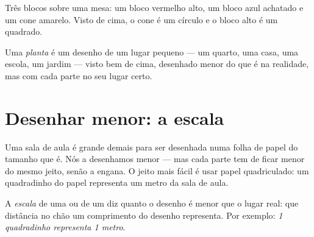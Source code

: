\begin{omfigure}

{\small Três blocos sobre uma mesa: um bloco vermelho alto, um bloco azul
achatado e um cone amarelo. Visto de cima, o cone é um círculo e o bloco
alto é um quadrado.}
\label{fig:g2:drawing-to-map:blocks}
\end{omfigure}

\begin{definition}[Planta]\label{def:g2:drawing-to-map:plan}
Uma \emph{planta} é um desenho de um lugar pequeno --- um
quarto, uma casa, uma escola, um jardim --- visto bem de cima, desenhado
menor do que é na realidade, mas com cada parte no seu lugar certo.
\end{definition}

\section{Desenhar menor: a escala}

Uma sala de aula é grande demais para ser desenhada numa folha de papel
do tamanho que é. Nós a desenhamos menor --- mas cada parte tem de ficar
menor do mesmo jeito, senão a  engana. O jeito mais fácil é usar papel
quadriculado: um quadradinho do papel representa um metro da sala de aula.

\begin{definition}[Escala]\label{def:g2:drawing-to-map:scale}
A \emph{escala} de uma  ou de um  diz quanto o
desenho é menor que o lugar real: que distância no chão um comprimento do
desenho representa. Por exemplo: \emph{1 quadradinho representa 1 metro}.
\end{definition}

